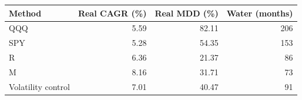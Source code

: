 \begin{tabular}{@{}lrrr@{}}\toprule
Method & Real CAGR (\%) & Real MDD (\%) & Water (months)\\\midrule
QQQ & 5.59 & 82.11 & 206\\
SPY & 5.28 & 54.35 & 153\\
R & 6.36 & 21.37 & 86\\
M & 8.16 & 31.71 & 73\\
Volatility control & 7.01 & 40.47 & 91\\
\bottomrule
\end{tabular}
